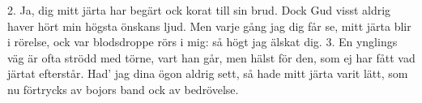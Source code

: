 2.  Ja, dig mitt järta har begärt ock korat till sin brud.
    Dock Gud visst aldrig haver hört min högsta önskans ljud.
    Men varje gång jag dig får se, mitt järta blir i rörelse,
    ock var blodsdroppe rörs i mig: så högt jag älskat dig.
3.  En ynglings väg är ofta strödd med törne, vart han går,
    men hälst för den, som ej har fått vad järtat efterstår.
    Had' jag dina ögon aldrig sett, så hade mitt järta varit lätt,
    som nu förtrycks av bojors band ock av bedrövelse.
